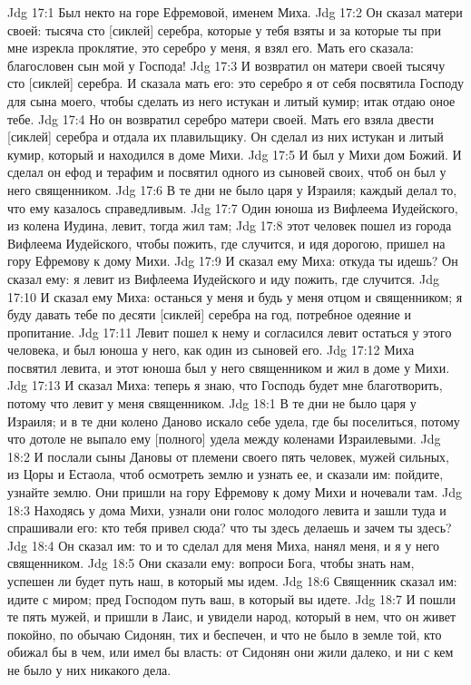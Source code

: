 Jdg 17:1  Был некто на горе Ефремовой, именем Миха.
Jdg 17:2  Он сказал матери своей: тысяча сто [сиклей] серебра, которые у тебя взяты и за которые ты при мне изрекла проклятие, это серебро у меня, я взял его. Мать его сказала: благословен сын мой у Господа!
Jdg 17:3  И возвратил он матери своей тысячу сто [сиклей] серебра. И сказала мать его: это серебро я от себя посвятила Господу для сына моего, чтобы сделать из него истукан и литый кумир; итак отдаю оное тебе.
Jdg 17:4  Но он возвратил серебро матери своей. Мать его взяла двести [сиклей] серебра и отдала их плавильщику. Он сделал из них истукан и литый кумир, который и находился в доме Михи.
Jdg 17:5  И был у Михи дом Божий. И сделал он ефод и терафим и посвятил одного из сыновей своих, чтоб он был у него священником.
Jdg 17:6  В те дни не было царя у Израиля; каждый делал то, что ему казалось справедливым.
Jdg 17:7  Один юноша из Вифлеема Иудейского, из колена Иудина, левит, тогда жил там;
Jdg 17:8  этот человек пошел из города Вифлеема Иудейского, чтобы пожить, где случится, и идя дорогою, пришел на гору Ефремову к дому Михи.
Jdg 17:9  И сказал ему Миха: откуда ты идешь? Он сказал ему: я левит из Вифлеема Иудейского и иду пожить, где случится.
Jdg 17:10  И сказал ему Миха: останься у меня и будь у меня отцом и священником; я буду давать тебе по десяти [сиклей] серебра на год, потребное одеяние и пропитание.
Jdg 17:11  Левит пошел к нему и согласился левит остаться у этого человека, и был юноша у него, как один из сыновей его.
Jdg 17:12  Миха посвятил левита, и этот юноша был у него священником и жил в доме у Михи.
Jdg 17:13  И сказал Миха: теперь я знаю, что Господь будет мне благотворить, потому что левит у меня священником.
Jdg 18:1  В те дни не было царя у Израиля; и в те дни колено Даново искало себе удела, где бы поселиться, потому что дотоле не выпало ему [полного] удела между коленами Израилевыми.
Jdg 18:2  И послали сыны Дановы от племени своего пять человек, мужей сильных, из Цоры и Естаола, чтоб осмотреть землю и узнать ее, и сказали им: пойдите, узнайте землю. Они пришли на гору Ефремову к дому Михи и ночевали там.
Jdg 18:3  Находясь у дома Михи, узнали они голос молодого левита и зашли туда и спрашивали его: кто тебя привел сюда? что ты здесь делаешь и зачем ты здесь?
Jdg 18:4  Он сказал им: то и то сделал для меня Миха, нанял меня, и я у него священником.
Jdg 18:5  Они сказали ему: вопроси Бога, чтобы знать нам, успешен ли будет путь наш, в который мы идем.
Jdg 18:6  Священник сказал им: идите с миром; пред Господом путь ваш, в который вы идете.
Jdg 18:7  И пошли те пять мужей, и пришли в Лаис, и увидели народ, который в нем, что он живет покойно, по обычаю Сидонян, тих и беспечен, и что не было в земле той, кто обижал бы в чем, или имел бы власть: от Сидонян они жили далеко, и ни с кем не было у них никакого дела.
